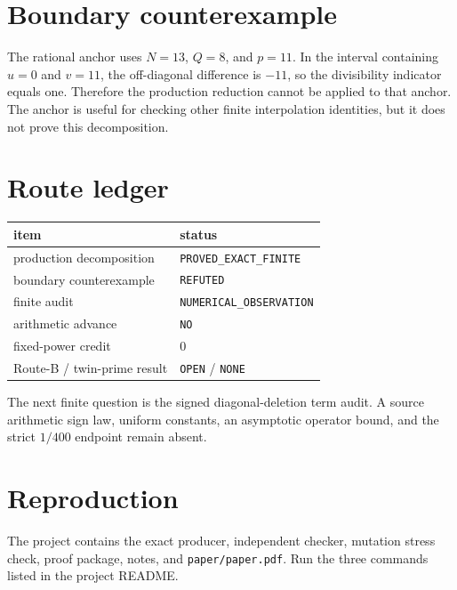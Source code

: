 \documentclass[11pt]{article}
\begin{document}
\section{Boundary counterexample}
The rational anchor uses $N=13$, $Q=8$, and $p=11$.  In the interval containing
$u=0$ and $v=11$, the off-diagonal difference is $-11$, so the divisibility
indicator equals one.  Therefore the production reduction cannot be applied
to that anchor.  The anchor is useful for checking other finite interpolation
identities, but it does not prove this decomposition.

\section{Route ledger}
\begin{center}\begin{tabular}{@{}ll@{}}\toprule
item & status\\\midrule
production decomposition & \texttt{PROVED\_EXACT\_FINITE}\\
boundary counterexample & \texttt{REFUTED}\\
finite audit & \texttt{NUMERICAL\_OBSERVATION}\\
arithmetic advance & \texttt{NO}\\
fixed-power credit & $0$\\
Route-B / twin-prime result & \texttt{OPEN} / \texttt{NONE}\\
\bottomrule\end{tabular}\end{center}
The next finite question is the signed diagonal-deletion term audit.  A source
arithmetic sign law, uniform constants, an asymptotic operator bound, and the
strict $1/400$ endpoint remain absent.

\section*{Reproduction}
The project contains the exact producer, independent checker, mutation stress
check, proof package, notes, and \texttt{paper/paper.pdf}.  Run the three
commands listed in the project README.
\end{document}
